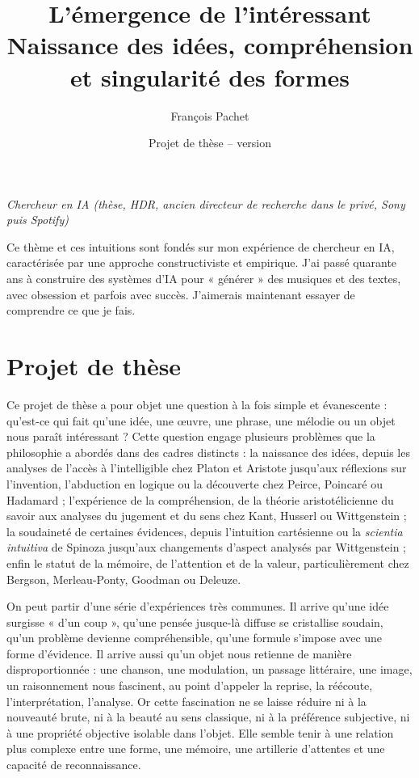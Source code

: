 \documentclass[10pt,a4paper]{article}
\title{L'émergence de l'intéressant\\
\large Naissance des idées, compréhension et singularité des formes}
\author{François Pachet}
\date{Projet de thèse -- version \projectversion\\\small \projectdate}
\begin{document}
\maketitle

\begin{center}
\emph{Chercheur en IA (thèse, HDR, ancien directeur de recherche dans le privé,
Sony puis Spotify)}
\end{center}

Ce thème et ces intuitions sont fondés sur mon expérience de chercheur en IA,
caractérisée par une approche constructiviste et empirique. J'ai passé quarante
ans à construire des systèmes d'IA pour « générer » des musiques et des textes,
avec obsession et parfois avec succès. J'aimerais maintenant essayer de
comprendre ce que je fais.

\section*{Projet de thèse}

Ce projet de thèse a pour objet une question à la fois simple et évanescente :
qu'est-ce qui fait qu'une idée, une œuvre, une phrase, une mélodie ou un objet
nous paraît intéressant ? Cette question engage plusieurs problèmes que la
philosophie a abordés dans des cadres distincts : la naissance des idées, depuis
les analyses de l'accès à l'intelligible chez Platon et Aristote jusqu'aux
réflexions sur l'invention, l'abduction en logique ou la découverte chez Peirce,
Poincaré ou Hadamard ; l'expérience de la compréhension, de la théorie
aristotélicienne du savoir aux analyses du jugement et du sens chez Kant, Husserl
ou Wittgenstein ; la soudaineté de certaines évidences, depuis l'intuition
cartésienne ou la \emph{scientia intuitiva} de Spinoza jusqu'aux changements
d'aspect analysés par Wittgenstein ; enfin le statut de la mémoire, de
l'attention et de la valeur, particulièrement chez Bergson, Merleau-Ponty,
Goodman ou Deleuze.

On peut partir d'une série d'expériences très communes. Il arrive qu'une idée
surgisse « d'un coup », qu'une pensée jusque-là diffuse se cristallise soudain,
qu'un problème devienne compréhensible, qu'une formule s'impose avec une forme
d'évidence. Il arrive aussi qu'un objet nous retienne de manière
disproportionnée : une chanson, une modulation, un passage littéraire, une image,
un raisonnement nous fascinent, au point d'appeler la reprise, la réécoute,
l'interprétation, l'analyse. Or cette fascination ne se laisse réduire ni à la
nouveauté brute, ni à la beauté au sens classique, ni à la préférence subjective,
ni à une propriété objective isolable dans l'objet. Elle semble tenir à une
relation plus complexe entre une forme, une mémoire, une artillerie d'attentes et
une capacité de reconnaissance.
\end{document}
